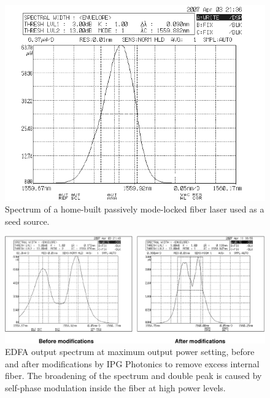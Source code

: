 \begin{figure}[h]
\begin{center}
\includegraphics[width=13cm]{figure-pcoct-seedspectrum.pdf}
\caption{Spectrum of a home-built passively mode-locked fiber laser \cite{venkatraman-thesis} used as a seed source.}
\label{figure:pcoct-seedspectrum}
\end{center}
\end{figure}


\begin{figure}[h]
\begin{center}
\includegraphics[width=16cm]{figure-pcoct-edfabeforeafter.pdf}
\caption{EDFA output spectrum at maximum output power setting, before and after modifications by IPG Photonics to remove excess internal fiber. The broadening of the spectrum and double peak is caused by self-phase modulation inside the fiber at high power levels.}
\label{figure:pcoct-edfabeforeafter}
\end{center}
\end{figure}

